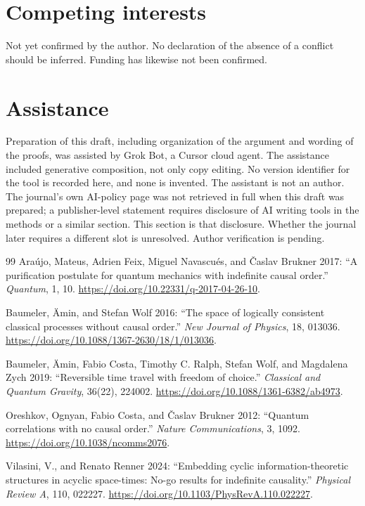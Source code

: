 \documentclass[11pt]{article}
\begin{document}
\section*{Competing interests}
Not yet confirmed by the author. No declaration of the absence of a conflict should be inferred. Funding has likewise not been confirmed.

\section*{Assistance}
Preparation of this draft, including organization of the argument and wording of the proofs, was assisted by Grok Bot, a Cursor cloud agent. The assistance included generative composition, not only copy editing. No version identifier for the tool is recorded here, and none is invented. The assistant is not an author. The journal's own AI-policy page was not retrieved in full when this draft was prepared; a publisher-level statement requires disclosure of AI writing tools in the methods or a similar section. This section is that disclosure. Whether the journal later requires a different slot is unresolved. Author verification is pending.

\begin{thebibliography}{99}
Ara{\'u}jo, Mateus, Adrien Feix, Miguel Navascu{\'e}s, and {\v C}aslav Brukner 2017: ``A purification postulate for quantum mechanics with indefinite causal order.'' \emph{Quantum}, 1, 10. \url{https://doi.org/10.22331/q-2017-04-26-10}.

Baumeler, {\"A}min, and Stefan Wolf 2016: ``The space of logically consistent classical processes without causal order.'' \emph{New Journal of Physics}, 18, 013036. \url{https://doi.org/10.1088/1367-2630/18/1/013036}.

Baumeler, {\"A}min, Fabio Costa, Timothy C. Ralph, Stefan Wolf, and Magdalena Zych 2019: ``Reversible time travel with freedom of choice.'' \emph{Classical and Quantum Gravity}, 36(22), 224002. \url{https://doi.org/10.1088/1361-6382/ab4973}.

Oreshkov, Ognyan, Fabio Costa, and {\v C}aslav Brukner 2012: ``Quantum correlations with no causal order.'' \emph{Nature Communications}, 3, 1092. \url{https://doi.org/10.1038/ncomms2076}.

Vilasini, V., and Renato Renner 2024: ``Embedding cyclic information-theoretic structures in acyclic space-times: No-go results for indefinite causality.'' \emph{Physical Review A}, 110, 022227. \url{https://doi.org/10.1103/PhysRevA.110.022227}.
\end{thebibliography}
\end{document}
